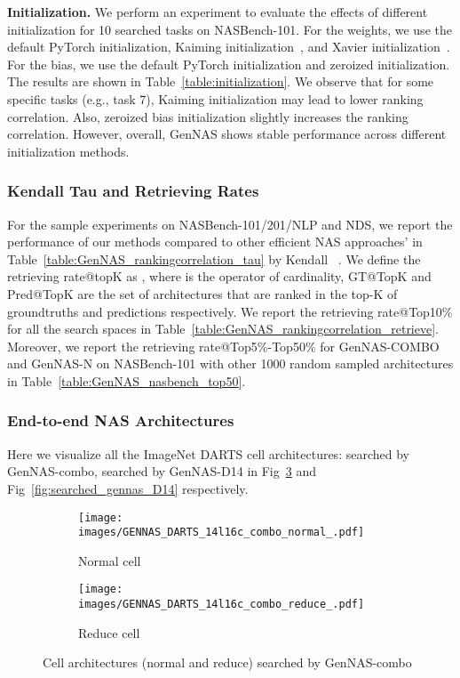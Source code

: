 \documentclass{article}
\begin{document}
\textbf{Initialization.}
We perform an experiment to evaluate the effects of different initialization for 10 searched tasks on NASBench-101. For the weights, we use the default PyTorch initialization, Kaiming initialization~\cite{he2015delving}, and Xavier initialization~\cite{glorot2010understanding}. For the bias, we use the default PyTorch initialization and zeroized initialization. The results are shown in Table~\ref{table:initialization}. We observe that for some specific tasks (e.g., task 7), Kaiming initialization may lead to lower ranking correlation. Also, zeroized bias initialization slightly increases the ranking correlation. However, overall, GenNAS shows stable performance across different initialization methods.
\subsubsection{Kendall Tau and Retrieving Rates}

For the sample experiments on NASBench-101/201/NLP and NDS, we report the performance of our methods compared to other efficient NAS approaches' in Table~\ref{table:GenNAS_rankingcorrelation_tau} by Kendall ~\cite{kendall1938new}. We define the retrieving rate@topK as , where  is the operator of cardinality, GT@TopK and Pred@TopK are the set of architectures that are ranked in the top-K of groundtruths and predictions respectively. We report the retrieving rate@Top10\% for all the search spaces in Table~\ref{table:GenNAS_rankingcorrelation_retrieve}. Moreover, we report the retrieving rate@Top5\%-Top50\% for GenNAS-COMBO and GenNAS-N on NASBench-101 with other 1000 random sampled architectures in Table~\ref{table:GenNAS_nasbench_top50}.


\subsubsection{End-to-end NAS Architectures}

Here we visualize all the ImageNet DARTS cell architectures: searched by GenNAS-combo, searched by GenNAS-D14 in Fig~\ref{fig:searched_gennas_combo} and Fig~\ref{fig:searched_gennas_D14} respectively.

\begin{figure}[h]
\centering
     \begin{subfigure}[b]{0.48\textwidth}
         \centering
         \texttt{[image: images/GENNAS\_DARTS\_14l16c\_combo\_normal\_.pdf]}
         \caption{Normal cell}
         \label{fig:COMBOnormal}
     \end{subfigure}
     \hfill
     \begin{subfigure}[b]{0.48\textwidth}
         \centering
         \texttt{[image: images/GENNAS\_DARTS\_14l16c\_combo\_reduce\_.pdf]}
         \caption{Reduce cell}
         \label{fig:COMBOreduce}
     \end{subfigure}
     \hfill
        \caption{Cell architectures (normal and reduce) searched by GenNAS-combo}
        \label{fig:searched_gennas_combo}
\end{figure}
\end{document}
